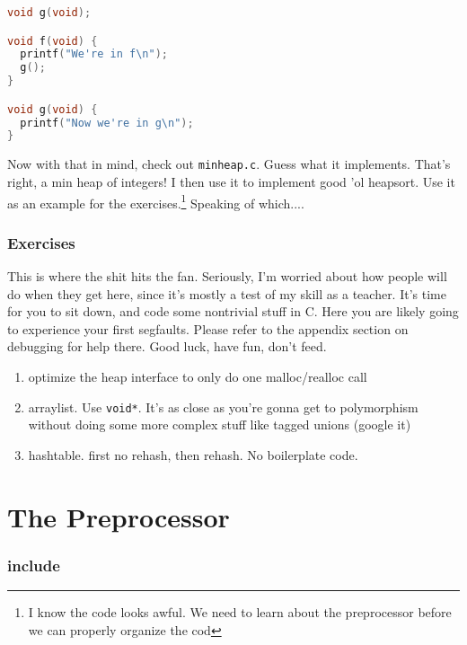 \documentclass[ebook,11pt,oneside,openany]{memoir}
\newcommand{\cf}[1]{\texttt{#1}}
\begin{document}
\begin{lstlisting}[language=C]
void g(void);

void f(void) {
  printf("We're in f\n");
  g();
}

void g(void) {
  printf("Now we're in g\n");
}
\end{lstlisting}


Now with that in mind, check out \cf{minheap.c}. Guess what it implements. That's right, a min heap of integers! I then use it to implement good 'ol heapsort. Use it as an example for the exercises.\footnote{I know the code looks awful. We need to learn about the preprocessor before we can properly organize the cod} Speaking of which....


\subsection{Exercises}

This is where the shit hits the fan. Seriously, I'm worried about how people will do when they get here, since it's mostly a test of my skill as a teacher. It's time for you to sit down, and code some nontrivial stuff in C. Here you are likely going to experience your first segfaults. Please refer to the appendix section on debugging for help there. Good luck, have fun, don't feed.

\begin{enumerate}

\item optimize the heap interface to only do one malloc/realloc call
\item arraylist. Use \cf{void*}. It's as close as you're gonna get to polymorphism without doing some more complex stuff like tagged unions (google it)

\item hashtable. first no rehash, then rehash. No boilerplate code.

\end{enumerate}


\chapter{The Preprocessor}
\label{ch:pre}
\subsection{include}
\end{document}
